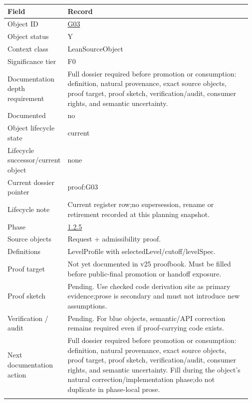 \begin{longtable}{L{0.16\linewidth} L{0.81\linewidth}}
\hline
\textbf{Field} & \textbf{Record}\\
\hline
Object ID & \hyperlink{object-row-G03}{G03}\\
\hline\addlinespace[0.20em]
Object status & Y\\
\hline\addlinespace[0.20em]
Context class & LeanSourceObject\\
\hline\addlinespace[0.20em]
Significance tier & F0\\
\hline\addlinespace[0.20em]
Documentation depth requirement & Full dossier required before promotion or consumption: definition, natural provenance, exact source objects, proof target, proof sketch, verification/\allowbreak{}audit, consumer rights, and semantic uncertainty.\\
\hline\addlinespace[0.20em]
Documented & no\\
\hline\addlinespace[0.20em]
Object lifecycle state & current\\
\hline\addlinespace[0.20em]
Lifecycle successor/\allowbreak{}current object & none\\
\hline\addlinespace[0.20em]
Current dossier pointer & proof:G03\\
\hline\addlinespace[0.20em]
Lifecycle note & Current register row;\newline no supersession, rename or retirement recorded at this planning snapshot.\\
\hline\addlinespace[0.20em]
Phase & \hyperlink{phase-row-1-2-5}{1.2.5}\\
\hline\addlinespace[0.20em]
Source objects & Request + admissibility proof.\\
\hline\addlinespace[0.20em]
Definitions & LevelProfile with selectedLevel/\allowbreak{}cutoff/\allowbreak{}levelSpec.\\
\hline\addlinespace[0.20em]
Proof target & Not yet documented in v25 proofbook. Must be filled before public-final promotion or handoff exposure.\\
\hline\addlinespace[0.20em]
Proof sketch & Pending. Use checked code derivation site as primary evidence;\newline prose is secondary and must not introduce new assumptions.\\
\hline\addlinespace[0.20em]
Verification /\allowbreak{} audit & Pending. For blue objects, semantic/\allowbreak{}API correction remains required even if proof-carrying code exists.\\
\hline\addlinespace[0.20em]
Next documentation action & Full dossier required before promotion or consumption: definition, natural provenance, exact source objects, proof target, proof sketch, verification/\allowbreak{}audit, consumer rights, and semantic uncertainty. Fill during the object's natural correction/\allowbreak{}implementation phase;\newline do not duplicate in phase-local prose.\\
\hline\addlinespace[0.20em]
\end{longtable}

